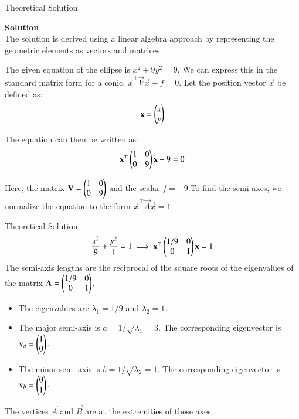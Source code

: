 \documentclass{beamer}
\begin{document}
\begin{frame}{Theoretical Solution}

\noindent\textbf{Solution}\\
The solution is derived using a linear algebra approach by representing the geometric elements as vectors and matrices.

The given equation of the ellipse is $x^2 + 9y^2 = 9$. We can express this in the standard matrix form for a conic, $\vec{x}^\top\vec{V}\vec{x} + f = 0$.
Let the position vector $\vec{x}$ be defined as:
\begin{align}
    \mathbf{x} = \begin{pmatrix}x \\ y\end{pmatrix}
\end{align}
    

The equation can then be written as:
\begin{align}
     \mathbf{x}^\top \begin{pmatrix}1 & 0 \\ 0 & 9\end{pmatrix} \mathbf{x} - 9 = 0
\end{align}
   
Here, the matrix $\mathbf{V} = \begin{pmatrix}1 & 0 \\ 0 & 9\end{pmatrix}$ and the scalar $f = -9$.To find the semi-axes, we normalize the equation to the form $\vec{x}^\top\vec{A}\vec{x} = 1$:

\end{frame}
\begin{frame}{Theoretical Solution}
\begin{align}
    \frac{x^2}{9} + \frac{y^2}{1} = 1 \implies \mathbf{x}^\top \begin{pmatrix}1/9 & 0 \\ 0 & 1\end{pmatrix} \mathbf{x} = 1
\end{align}
The semi-axis lengths are the reciprocal of the square roots of the eigenvalues of the matrix $\mathbf{A} = \begin{pmatrix}1/9 & 0 \\ 0 & 1\end{pmatrix}$.
\begin{itemize}
    \item The eigenvalues are $\lambda_1 = 1/9$ and $\lambda_2 = 1$.
    \item The major semi-axis is $a = 1/\sqrt{\lambda_1} = 3$. The corresponding eigenvector is $\mathbf{v}_a = \begin{pmatrix}1 \\ 0\end{pmatrix}$.
    \item The minor semi-axis is $b = 1/\sqrt{\lambda_2} = 1$. The corresponding eigenvector is $\mathbf{v}_b = \begin{pmatrix}0 \\ 1\end{pmatrix}$.
\end{itemize}
The vertices $\vec{A}$ and $\vec{B}$ are at the extremities of these axes.

\end{frame}
\end{document}
